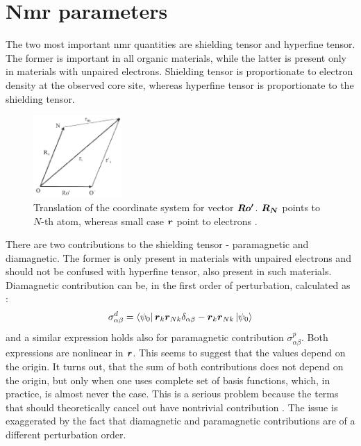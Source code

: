 \documentclass[openany, longbibliography,slovene,a4paper,12pt]{article}
\def\vec#1{\mbox{\boldmath$#1$}}
\begin{document}
\section{Nmr parameters}
The two most important nmr quantities are shielding tensor and hyperfine tensor.
The former is important in all organic materials, while the latter is present
only in materials with unpaired electrons. Shielding tensor is 
proportionate to electron density at the observed  core site, whereas hyperfine
tensor is proportionate to the shielding tensor.


\begin{figure}
\centering
\includegraphics[width=0.3\textwidth]{origin_dependance_tensor.png}
\caption{Translation of the coordinate system for vector $\vec{Ro'}$. $\vec{R_N}$
  points to $N$-th atom, whereas small case $\vec r$ point to electrons  \cite{chemic_shift_tensor_review}.}
\end{figure}

  There are two contributions to the shielding tensor - paramagnetic and
  diamagnetic. The former is only present in materials with unpaired electrons
  and should not be confused with hyperfine tensor, also present in such materials.
  Diamagnetic contribution can be, in the first order of perturbation, calculated as \cite{chemic_shift_tensor_review}:
  \begin{equation}
    \sigma^d_{\alpha \beta}=\bra{\psi_0}\vec{r}_k \vec{r}_{Nk}\delta_{\alpha\beta}- \vec{r}_{k}\vec{r}_{Nk} \ket{\psi_0}
  \end{equation}
  and a similar expression holds also for paramagnetic contribution $\sigma^p_{\alpha\beta}$. Both
  expressions are nonlinear in $\vec r$. This seems to suggest that the values
  depend on the origin. It turns out, that the sum of both contributions does
  not depend on the origin, but only when one uses complete set of basis functions,
  which, in practice, is almost never the case. This is a serious problem
  because the terms that should theoretically cancel out have nontrivial
  contribution \cite{chemic_shift_tensor_review}. The issue is exaggerated by
  the fact that diamagnetic and paramagnetic contributions are of a different
  perturbation order.
\end{document}
